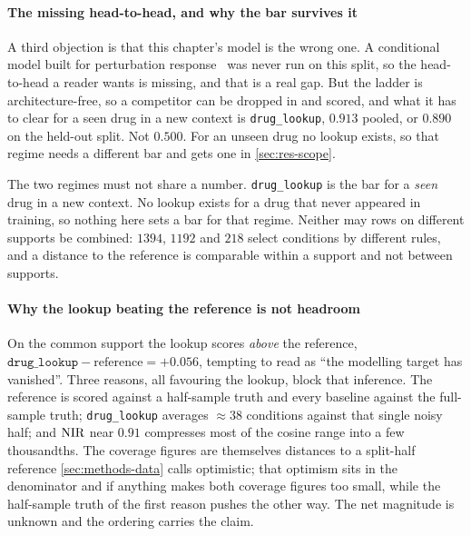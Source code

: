 \paragraph{The missing head-to-head, and why the bar survives it} A third
objection is that this chapter's model is the wrong one. A conditional model
built for perturbation response~\cite{cpa,scgen,gears} was never run on this
split, so the head-to-head a reader wants is missing, and that is a real gap. But
the ladder is architecture-free, so a competitor can be dropped in and scored,
and what it has to clear for a seen drug in a new context is
\texttt{drug\_lookup}, $0.913$ pooled, or $0.890$ on the held-out split. Not
$0.500$. For an unseen drug no lookup exists, so that regime needs a different
bar and gets one in \cref{sec:res-scope}.

\begin{scopelimit}
The two regimes must not share a number. \texttt{drug\_lookup} is the bar for a
\emph{seen} drug in a new context. No lookup exists for a drug that never
appeared in training, so nothing here sets a bar for that regime. Neither may
rows on different supports be combined: $\num{1394}$, $\num{1192}$ and
$\num{218}$ select conditions by different rules, and a distance to the reference
is comparable within a support and not between supports.
\end{scopelimit}

\paragraph{Why the lookup beating the reference is not headroom} On the common
support the lookup scores \emph{above} the reference,
$\texttt{drug\_lookup} - \textrm{reference} = +0.056$, tempting to read as ``the
modelling target has vanished''. Three reasons, all favouring the lookup, block
that inference. The reference is scored against a half-sample truth and every
baseline against the full-sample truth; \texttt{drug\_lookup} averages
$\approx 38$ conditions against that single noisy half; and $\textrm{NIR}$ near $0.91$
compresses most of the cosine range into a few thousandths. The coverage figures
are themselves distances to a split-half reference \cref{sec:methods-data} calls
optimistic; that optimism sits in the denominator and if anything makes both
coverage figures too small, while the half-sample truth of the first reason
pushes the other way. The net magnitude is unknown and the ordering carries the
claim.

